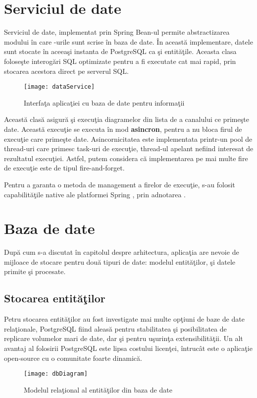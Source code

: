 \section{Serviciul de date}
Serviciul de date, implementat prin Spring Bean-ul  permite abstractizarea modului în care -urile sunt scrise în baza de date. În această implementare, datele sunt stocate în aceeaşi instanta de PostgreSQL ca şi entităţile. Aceasta clasa foloseşte interogări SQL optimizate pentru a fi executate cat mai rapid, prin stocarea acestora direct pe serverul SQL.
\begin{figure}[H]
	\centering
	\texttt{[image: dataService]}
	\caption{Interfaţa aplicaţiei cu baza de date pentru informaţii}
	\label{fig:dataService}
\end{figure}
Această clasă asigură şi execuţia diagramelor din lista de  a canalului ce primeşte date. Această execuţie se executa în mod \textbf{asincron}, pentru a nu bloca firul de execuţie care primeşte date. Asincornicitatea este implementata printr-un pool de thread-uri care primesc task-uri de execuţie, thread-ul apelant nefiind interesat de rezultatul execuţiei. Astfel, putem considera că implementarea pe mai multe fire de execuţie este de tipul fire-and-forget.

Pentru a garanta o metoda de management a firelor de execuţie, s-au folosit capabilităţile native ale platformei Spring \autocite{springAsync} , prin adnotarea .
\section{Baza de date}

După cum s-a discutat în capitolul despre arhitectura, aplicaţia are nevoie de mijloace de stocare pentru două tipuri de date: modelul entităţilor, şi datele primite şi procesate.
\subsection{Stocarea entităţilor} 
Petru stocarea entităţilor au fost investigate mai multe opţiuni de baze de date relaţionale, PostgreSQL fiind aleasă pentru stabilitatea şi posibilitatea de replicare volumelor mari de date, dar şi pentru uşurinţa extensibilităţii\autocite{postgresql}. Un alt avantaj al folosirii PostgreSQL este lipsa costului licenţei, întrucât este o aplicaţie open-source cu o comunitate foarte dinamică.
\begin{landscape}
	\begin{figure}
		\centering
		\texttt{[image: dbDiagram]}
		\caption{Modelul relaţional al entităţilor din baza de date}
		\label{fig:dbDiagram}
	\end{figure}
\end{landscape}

